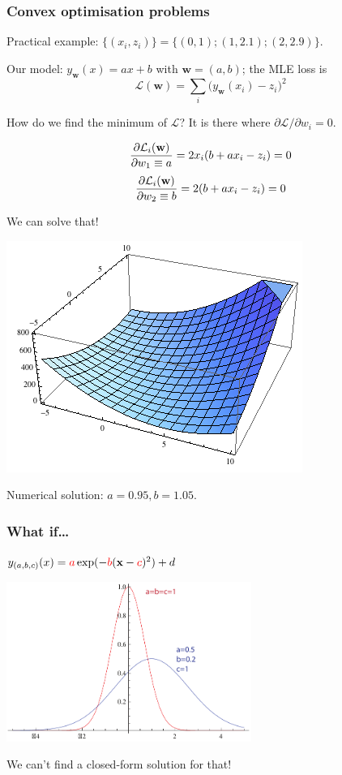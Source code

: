 \documentclass[USenglish,pdftex,compress,10pt,svgnamesi,handout]{beamer}
\def\Vec#1{\textbf{#1}}
\begin{document}
\begin{frame}
\frametitle{Convex optimisation problems}
Practical example: $\{(x_i, z_i)\} = \{ (0,1); (1, 2.1); (2, 2.9)\}$.

Our model: $y_{\Vec w}(x) = a x + b$ with $\Vec w=(a,b)$; the MLE loss is
$$
\mathcal L(\Vec w) = \sum_i \bigl(y_{\Vec w}(x_i) - z_i\bigr)^2
$$

How do we find the minimum of $\mathcal L$?
  It is there where $\partial \mathcal L / \partial w_i = 0$.
  
  \pause 
  
  $$
{\partial \mathcal L_i(\Vec w) \over \partial w_1\equiv a} = 2 x_i (b + a x_i - z_i) = 0
$$
$$
{\partial \mathcal L_i(\Vec w) \over \partial w_2\equiv b} = 2 (b + a x_i - z_i) = 0 
$$

We can solve that!
\end{frame}
   \begin{frame}
\includegraphics[width=\textwidth]{simpleefunc}

Numerical solution: $a=0.95, b=1.05$.
\end{frame}


\begin{frame}
\frametitle{What if\dots}
$y_{(a,b,c)}(x) = {\color{red}a} \exp(-{\color{red}b}(\Vec x-{\color{red}c})^2) + d$

\includegraphics[width=8cm]{pics/exp}

We can't find a closed-form solution for that!
\end{frame}
\end{document}
